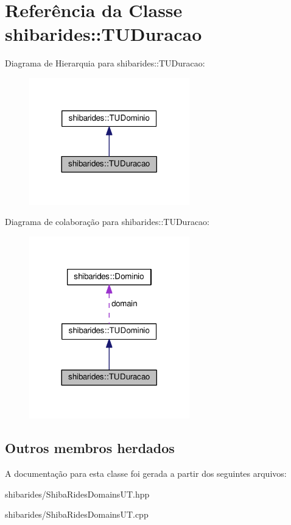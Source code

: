 \hypertarget{classshibarides_1_1TUDuracao}{}\section{Referência da Classe shibarides\+:\+:T\+U\+Duracao}
\label{classshibarides_1_1TUDuracao}


Diagrama de Hierarquia para shibarides\+:\+:T\+U\+Duracao\+:\nopagebreak
\begin{figure}[H]
\begin{center}
\leavevmode
\includegraphics[width=197pt]{classshibarides_1_1TUDuracao__inherit__graph}
\end{center}
\end{figure}


Diagrama de colaboração para shibarides\+:\+:T\+U\+Duracao\+:\nopagebreak
\begin{figure}[H]
\begin{center}
\leavevmode
\includegraphics[width=197pt]{classshibarides_1_1TUDuracao__coll__graph}
\end{center}
\end{figure}
\subsection*{Outros membros herdados}


A documentação para esta classe foi gerada a partir dos seguintes arquivos\+:\begin{DoxyCompactItemize}
\item 
shibarides/Shiba\+Rides\+Domains\+U\+T.\+hpp\item 
shibarides/Shiba\+Rides\+Domains\+U\+T.\+cpp\end{DoxyCompactItemize}
